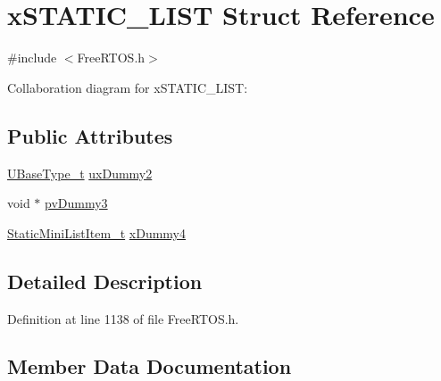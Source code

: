 \hypertarget{structx_s_t_a_t_i_c___l_i_s_t}{}\section{x\+S\+T\+A\+T\+I\+C\+\_\+\+L\+I\+ST Struct Reference}
\label{structx_s_t_a_t_i_c___l_i_s_t}


{\ttfamily \#include $<$Free\+R\+T\+O\+S.\+h$>$}



Collaboration diagram for x\+S\+T\+A\+T\+I\+C\+\_\+\+L\+I\+ST\+:
\subsection*{Public Attributes}
\begin{DoxyCompactItemize}
\item 
\hyperlink{externals_2freertos_2portable_2_g_c_c_2_a_r_m___c_m0_2portmacro_8h_a646f89d4298e4f5afd522202b11cb2e6}{U\+Base\+Type\+\_\+t} \hyperlink{structx_s_t_a_t_i_c___l_i_s_t_aa0522bc6ec8c956a9177ed9cb0e6d19f}{ux\+Dummy2}
\item 
void $\ast$ \hyperlink{structx_s_t_a_t_i_c___l_i_s_t_aee46aef7379c7a341ec5a3e70d6dc85f}{pv\+Dummy3}
\item 
\hyperlink{externals_2freertos_2include_2_free_r_t_o_s_8h_a9097f48f4dfa56e8e01d9179462c7994}{Static\+Mini\+List\+Item\+\_\+t} \hyperlink{structx_s_t_a_t_i_c___l_i_s_t_aafa5f9d67d7f3636f2d1f8c372e75ecf}{x\+Dummy4}
\end{DoxyCompactItemize}


\subsection{Detailed Description}


Definition at line 1138 of file Free\+R\+T\+O\+S.\+h.



\subsection{Member Data Documentation}
\mbox{\label{structx_s_t_a_t_i_c___l_i_s_t_aee46aef7379c7a341ec5a3e70d6dc85f}} 
